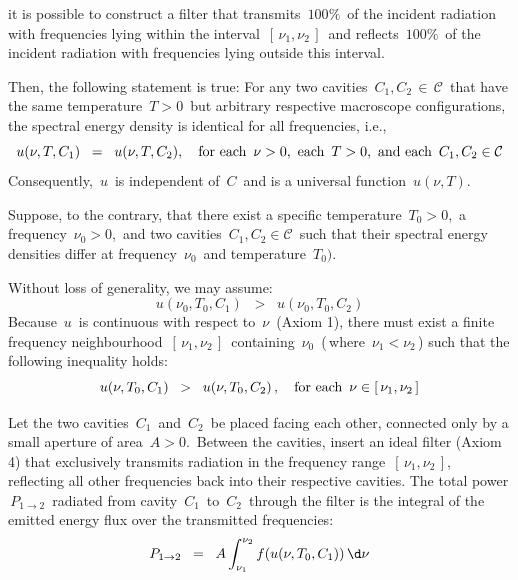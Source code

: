 \begin{theorem}
\begin{itemize}
    it is possible to construct a filter that transmits \,$100\%$\,
    of the incident radiation with frequencies lying within the interval
    \,$[\,\nu_{1}, \nu_{2}\,]$\,
    and reflects \,$100\%$\, of the incident radiation
    with frequencies lying outside this interval.
\end{itemize}
Then, the following statement is true:
For any two cavities
\,$C_{1}, C_{2} \,\in\, \mathcal{C}$\,
that have the same temperature \,$T > 0$\,
but arbitrary respective macroscope configurations,
the spectral energy density is identical for all frequencies, i.e.,
\begin{equation*}
u(\nu, T, C_{1})
\;\;=\;\;
    u(\nu, T, C_{2}),
\quad
\textnormal{for each \,$\nu > 0$,\, each \,$T > 0$,\, and each \,$C_{1}, C_{2} \in \mathcal{C}$}
\end{equation*}
Consequently, \,$u$\, is independent of \,$C$\, and is a universal function \,$u(\nu, T)$.\,
\end{theorem}
\proof
Suppose, to the contrary, that there exist a specific temperature
\,$T_{0} > 0$,\, a frequency \,$\nu_0 > 0$,\, and two cavities
\,$C_{1}, C_{2} \in \mathcal{C}$\,
such that their spectral energy densities differ
at frequency \,$\nu_{0}$\, and temperature \,$T_{0})$.\,

\vskip 0.2cm
\noindent
Without loss of generality, we may assume:
\begin{equation*}
u(\nu_0, T_{0}, C_{1})
\;\; > \;\;
    u(\nu_0, T_{0}, C_{2})
\end{equation*}
Because \,$u$\, is continuous with respect to \,$\nu$\, (Axiom 1),
there must exist a finite frequency neighbourhood \,$[\,\nu_{1}, \nu_{2}\,]$\,
containing \,$\nu_{0}$\, (\,where \,$\nu_{1} < \nu_{2}$\,)
such that the following inequality holds:
\begin{equation*}
u(\nu, T_{0}, C_{1})
\;\; > \;\;
    u(\nu, T_{0}, C_{2})\,,
\quad
\textnormal{for each \,$\nu \in [\,\nu_{1}, \nu_{2}\,]$}
\end{equation*}

\vskip 0.2cm
\noindent
Let the two cavities
\,$C_{1}$\, and \,$C_{2}$\,
be placed facing each other,
connected only by a small aperture of area \,$A > 0$.\,
Between the cavities, insert an ideal filter (Axiom 4)
that exclusively transmits radiation in the frequency range \,$[\,\nu_{1}, \nu_{2}\,]$,\,
reflecting all other frequencies back into their respective cavities.
The total power \,$P_{1 \to 2}$\, radiated from cavity \,$C_{1}$\, to \,$C_{2}$\,
through the filter is the integral of the emitted energy flux over the transmitted frequencies:
\begin{equation*}
P_{1 \rightarrow 2}
\;\; = \;\;
    A \int_{\nu_{1}}^{\nu_{2}} f(u(\nu, T_{0}, C_{1})) \, \d\nu
\end{equation*}

